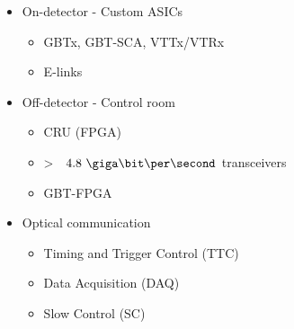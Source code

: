 \documentclass[aspectratio=43]{beamer}
\makeatletter
\newenvironment{backgroundblock}[2]{%
  \global\setbox\@backgroundblock=\vbox\bgroup%
    \unvbox\@backgroundblock%
    \vbox to0pt\bgroup\vskip#2\hbox to0pt\bgroup\hskip#1\relax%
}{\egroup\egroup\egroup}
\makeatother
\begin{document}
{\begin{frame}
\begin{itemize}
\item On-detector - Custom ASICs
	\begin{itemize}
	\item GBTx, GBT-SCA, VTTx/VTRx
	\item E-links
	\end{itemize}
\item Off-detector - Control room
	\begin{itemize}
	\item CRU (FPGA)
	\item \textgreater~ $4.8~\giga\bit\per\second$ transceivers
	\item GBT-FPGA
	\end{itemize}
\item Optical communication
	\begin{itemize}
	\item Timing and Trigger Control (TTC)
	\item Data Acquisition	(DAQ)
	\item Slow Control (SC)
	\end{itemize}
\end{itemize}

\end{frame}


}
\end{document}
